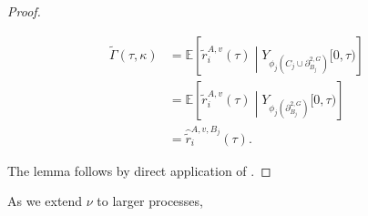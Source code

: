\documentclass[12pt]{article}
\newcommand{\mb}{\mathbb}
\newcommand{\ex}[1]{\mb{E}\left[#1\right]}			%
\newcommand{\dgneigh}[2]{\partial^{2,#1}_{#2}}		%
\newcommand{\rate}{r}								%
\newcommand{\vind}[1]{_{#1}}						%
\newcommand{\tme}[1]{(#1)}							%
\newcommand{\tmi}[1]{#1}							%
\newcommand{\stpara}[1]{_{#1}}						%
\newcommand{\gvpara}[2]{^{#1,#2}}					%
\newcommand{\Xg}{Y}									%
\newcommand{\brate}{\alt{\rate}}					%
\newcommand{\alt}[1]{\tilde{#1}}					%
\newcommand{\rt}{\tau}								%
\renewcommand{\mark}{\kappa}						%
\newcommand{\ratee}{\Gamma}							%
\newcommand{\cratee}{\alt{\ratee}}					%
\newcommand{\mm}{\nu}								%
\newcommand{\bcrate}{\hat{\brate}}					%
\newcommand{\gvjpara}[3]{^{#1,#2,#3}}				%
\begin{document}
\begin{proof}
\begin{description}
\begin{align*}
\cratee(\rt,\mark) &= \ex{\brate\gvpara{A}{v}\stpara{i}(\rt)\middle|\Xg\vind{\phi_j\left(C_j\cup\dgneigh{G}{B_j}\right)}\tmi{[0,\rt)}}\\
&= \ex{\brate\gvpara{A}{v}\stpara{i}(\rt)\middle|\Xg\vind{\phi_j\left(\dgneigh{G}{B_j}\right)}\tmi{[0,\rt)}}\\
&= \bcrate\gvjpara{A}{v}{B_j}\stpara{i}\tme{\rt}.
\end{align*}
\end{description}

The lemma follows by direct application of \cite[Exercise 14.7.1]{DalVer08}.
\end{proof}

As we extend \(\mm\) to larger processes, 



\newpage


\end{document}
